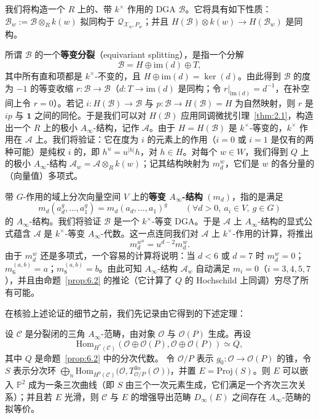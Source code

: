 我们将构造一个 $R$ 上的、带 $k^{\times}$ 作用的 DGA $\mathcal{B}$。它将具有如下性质：$\mathcal{B}_w:=\mathcal{B}\otimes_R k(w)$ 拟同构于 $\mathcal{Q}_{\mathcal{X}_w,P_w}$；并且 $H(\mathcal{B})\otimes k(w)\to H(\mathcal{B}_w)$ 是同构。

所谓 $\mathcal{B}$ 的一个\textbf{等变分裂}（equivariant splitting），是指一个分解
\[
\mathcal{B}=H\oplus\mathrm{im}(d)\oplus T,
\]
其中所有直和项都是 $k^{\times}$-不变的，且 $H\oplus\mathrm{im}(d)=\ker(d)$。由此得到 $\mathcal{B}$ 的度为 $-1$ 的等变收缩 $r:\mathcal{B}\to\mathcal{B}$（$d:T\to\mathrm{im}(d)$ 是同构；令 $r|_{\mathrm{im}(d)}=d^{-1}$，在补空间上令 $r=0$）。若记 $i:H(\mathcal{B})\to\mathcal{B}$ 与 $p:\mathcal{B}\to H(\mathcal{B})=H$ 为自然映射，则 $r$ 是 $ip$ 与 $\mathbf{1}$ 之间的同伦。于是我们可以对 $H(\mathcal{B})$ 应用同调微扰引理~\ref{thm:2.1}，构造出一个 $R$ 上的极小 $A_\infty$-结构，记作 $\mathcal{A}$。由于 $H=H(\mathcal{B})$ 是 $k^{\times}$-等变的，$k^{\times}$ 作用在 $\mathcal{A}$ 上。我们将验证：它在度为 $i$ 的元素上的作用（$i=0$ 或 $i=1$ 是仅有的两种可能）是纯权 $i$ 的，即 $h^u=u^{|h|}h$，对 $h\in H$。对每个 $w\in W$，我们得到 $Q$ 上的极小 $A_\infty$-结构 $\mathcal{A}_w=\mathcal{A}\otimes_R k(w)$；记其结构映射为 $m_d^w$，它们是 $w$ 的各分量的（向量值）多项式。


带 $G$-作用的域上分次向量空间 $V$ 上的\textbf{等变 $A_\infty$-结构} $(m_d)$，指的是满足
\[
m_d(a_d^g,\ldots,a_1^g)=m_d(a_d,\ldots,a_1)^g\qquad(\forall d>0,\ a_i\in V,\ g\in G)
\]
的 $A_\infty$-结构。我们将验证 $\mathcal{B}$ 是一个 $k^{\times}$-等变 DGA。于是 $\mathcal{A}$ 上 $A_\infty$-结构的显式公式蕴含 $\mathcal{A}$ 是 $k^{\times}$-等变 $A_\infty$-代数。这一点连同我们对 $\mathcal{A}$ 上 $k^{\times}$-作用的计算，将推出
\[
m_d^{w^u}=u^{d-2}m_d^w.
\]
由于 $m_d^w$ 还是多项式，一个容易的计算将说明：当 $d<6$ 或 $d=7$ 时 $m_d^w=0$；$m_6^{(a,b)}=a$；$m_8^{(a,b)}=b$。由此可知 $A_\infty$-结构 $\mathcal{A}_w$ 自动满足 $m_i=0$（$i=3,4,5,7$），并且由命题~\ref{prop:6.2} 的推论（它计算了 $Q$ 的 Hochschild 上同调）穷尽了所有可能。

在核验上述论证的细节之前，我们先记录由它得到的下述定理：

\begin{theorem}\label{thm:6.4}
设 $\mathcal{C}$ 是分裂闭的三角 $A_\infty$-范畴，由对象 $\mathcal{O}$ 与 $\mathcal{O}(P)$ 生成。再设
\[
\mathrm{Hom}_{H^*(\mathcal{C})}(\mathcal{O}\oplus\mathcal{O}(P),\mathcal{O}\oplus\mathcal{O}(P))\simeq Q,
\]
其中 $Q$ 是命题~\ref{prop:6.2} 中的分次代数。
令 $\mathcal{O}/P$ 表示 $g_0:\mathcal{O}\to\mathcal{O}(P)$ 的锥，令 $S$ 表示分次环 $\bigoplus_n\mathrm{Hom}_{H^0(\mathcal{C})}\bigl(\mathcal{O},T_{\mathcal{O}/P}^{3n}(\mathcal{O})\bigr)$，并置 $E=\mathrm{Proj}(S)$。则 $E$ 可以嵌入 $\mathbb{P}^2$ 成为一条三次曲线（即 $S$ 由三个一次元素生成，它们满足一个齐次三次关系）；并且若 $E$ 光滑，则 $\mathcal{C}$ 与 $E$ 的增强导出范畴 $D_\infty(E)$ 之间存在 $A_\infty$-范畴的拟等价。
\end{theorem}

